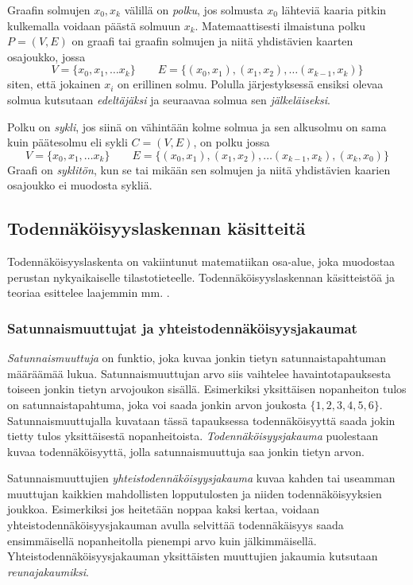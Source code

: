 Graafin solmujen $x_0, x_k$ välillä on \emph{polku}, jos solmusta $x_0$ lähteviä kaaria pitkin kulkemalla voidaan päästä solmuun $x_k$. Matemaattisesti ilmaistuna polku $P=(V,E)$ on graafi tai graafin solmujen ja niitä yhdistävien kaarten osajoukko, jossa 
$$
    V = \{x_0, x_1, \ldots x_k \} \qquad E = \{(x_0, x_1), (x_1,x_2),\ldots(x_{k-1}, x_k)\}
$$ 
siten, että jokainen $x_i$ on erillinen solmu. Polulla järjestyksessä ensiksi olevaa solmua kutsutaan \emph{edeltäjäksi} ja seuraavaa solmua sen \emph{jälkeläiseksi}.

Polku on \emph{sykli}, jos siinä on vähintään kolme solmua ja sen alkusolmu on sama kuin päätesolmu eli sykli $C = (V, E)$, on polku jossa
$$
    V = \{x_0, x_1, \ldots x_k \} \qquad E = \{(x_0, x_1), (x_1,x_2),\ldots(x_{k-1}, x_k), (x_k, x_0)\}
$$
Graafi on \emph{syklitön}, kun se tai mikään sen solmujen ja niitä yhdistävien kaarien osajoukko ei muodosta sykliä. 

\subsection{Todennäköisyyslaskennan käsitteitä}
Todennäköisyyslaskenta on vakiintunut matematiikan osa-alue, joka muodostaa perustan nykyaikaiselle tilastotieteelle. Todennäköisyyslaskennan käsitteistöä ja teoriaa esittelee laajemmin mm. \citet{dasgupta_probability_2011}.

\subsubsection{Satunnaismuuttujat ja yhteistodennäköisyysjakaumat}
\emph{Satunnaismuuttuja} on funktio, joka kuvaa jonkin tietyn satunnaistapahtuman määräämää lukua. Satunnaismuuttujan arvo siis vaihtelee havaintotapauksesta toiseen jonkin tietyn arvojoukon sisällä. Esimerkiksi yksittäisen nopanheiton tulos on satunnaistapahtuma, joka voi saada jonkin arvon joukosta $\{1,2,3,4,5,6\}$. Satunnaismuuttujalla kuvataan tässä tapauksessa todennäköisyyttä saada jokin tietty tulos yksittäisestä nopanheitoista. \emph{Todennäköisyysjakauma} puolestaan kuvaa todennäköisyyttä, jolla satunnaismuuttuja saa jonkin tietyn arvon.

Satunnaismuuttujien \emph{yhteistodennäköisyysjakauma} kuvaa kahden tai useamman muuttujan kaikkien mahdollisten lopputulosten ja niiden todennäköisyyksien joukkoa. Esimerkiksi jos heitetään noppaa kaksi kertaa, voidaan yhteistodennäköisyysjakauman avulla selvittää todennäkäisyys saada ensimmäisellä nopanheitolla pienempi arvo kuin jälkimmäisellä. Yhteistodennäköisyysjakauman yksittäisten muuttujien jakaumia kutsutaan \emph{reunajakaumiksi}.

